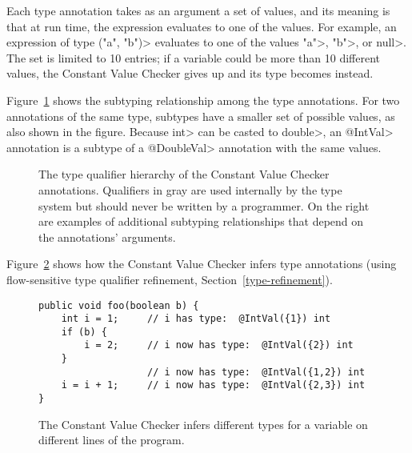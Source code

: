 Each type annotation takes as an argument a set of values, and its meaning
is that at run time, the expression evaluates to one of the values.  For
example, an expression of type
\<("a", "b")> evaluates to
one of the values \<"a">, \<"b">, or \<null>.
The set is limited to 10 entries; if a variable
could be more than 10 different values, the Constant Value
Checker gives up and its type becomes
 instead.


Figure~\ref{fig-value-hierarchy} shows the 
subtyping relationship among the type annotations.
For two annotations of the same type, subtypes have a smaller set of
possible values, as also shown in the figure.
Because \<int> can be casted to \<double>, an \<@IntVal> annotation is a
subtype of a \<@DoubleVal> annotation with the same values.

\begin{figure}
\begin{center}
\qquad\qquad
{}
\end{center}
\caption{The type qualifier hierarchy of the Constant Value Checker
annotations. Qualifiers in gray are used
internally by the type system but should never be written by a
programmer.  On the right are examples of additional subtyping
relationships that depend on the annotations' arguments.}
\label{fig-value-hierarchy}
\end{figure}

Figure~\ref{fig-value-multivalue} shows how the Constant Value Checker
infers type annotations (using flow-sensitive type qualifier refinement, Section~\ref{type-refinement}).

\begin{figure}
\begin{Verbatim}
public void foo(boolean b) {
    int i = 1;     // i has type:  @IntVal({1}) int
    if (b) {  
        i = 2;     // i now has type:  @IntVal({2}) int
    }        
                   // i now has type:  @IntVal({1,2}) int
    i = i + 1;     // i now has type:  @IntVal({2,3}) int
}
\end{Verbatim}
\caption{The Constant Value Checker infers different types
  for a variable on different lines of the program.}
\label{fig-value-multivalue}
\end{figure}


